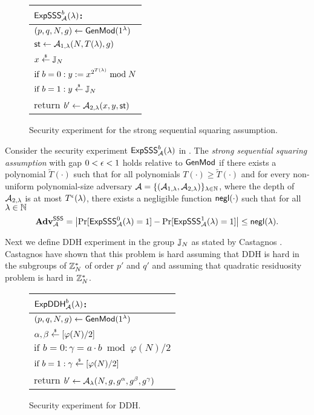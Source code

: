 \begin{figure}[h]
\begin{center}
\begin{tabular}{l}
$\mathsf{ExpSSS}_{\mathcal{A}}^{b}(\lambda)$: \\
\hline
$(p, q, N,g) \leftarrow \mathsf{GenMod}(1{^{\lambda}})$ \\
$\mathsf{st} \leftarrow \mathcal{A}_{1, \lambda}(N, T(\lambda),g)$\\
$x \stackrel{{\scriptscriptstyle\$}}{\leftarrow} \mathbb{J}_N$ \\
$\text{if } b = 0: y:=x^{2^{T(\lambda)}} \bmod N$\\
$\text{if } b = 1: y \stackrel{{\scriptscriptstyle\$}}{\leftarrow} \mathbb{J}_N$\\
return	$b' \leftarrow \mathcal{A}_{2,\lambda}(x, y, \mathsf{st})$
\end{tabular}
\end{center}
\caption{\label{fig:sss}Security experiment for the strong sequential squaring assumption.}
\end{figure}


\begin{definition}\label{def:sssa}
Consider the security experiment $\mathsf{ExpSSS}_{\mathcal{A}}^{b}(\lambda)$ in . The \emph{strong sequential squaring assumption} with gap $0< \epsilon <1$ holds relative to $\mathsf{GenMod}$ if there exists a polynomial $\tilde{T}(\cdot)$ such that for all polynomials $T(\cdot) \geq \tilde{T}(\cdot)$ and for every non-uniform polynomial-size adversary $\mathcal{A} = \{(\mathcal{A}_{1,\lambda}, \mathcal{A}_{2,\lambda})\}_{\lambda \in \mathbb{N}}$, where the depth of $\mathcal{A}_{2,\lambda}$ is at most $T^{\epsilon}(\lambda)$, there exists a negligible function $\mathsf{negl}(\cdot)$ such that for all $\lambda \in \mathbb{N}$ 
\[\mathbf{Adv}^\mathsf{SSS}_{\mathcal{A}} = \left| \Pr[\mathsf{ExpSSS}_{\mathcal{A}}^{0}(\lambda) = 1] - \Pr[\mathsf{ExpSSS}_{\mathcal{A}}^{1}(\lambda) = 1] \right| \leq \mathsf{negl}(\lambda).\]
\end{definition}

Next we define DDH experiment in the group $\mathbb{J}_N$ as stated by Castagnos \etal \cite{C:CouPetPoi16}. Castagnos \etal have shown that this problem is hard assuming that DDH is hard in the subgroups of $\mathbb{Z}_N^*$ of order $p'$ and $q'$ and assuming that quadratic residuosity problem is hard in $\mathbb{Z}_N^*$.  

\begin{figure}[h]
\begin{center}
\begin{tabular}{l}
$\mathsf{ExpDDH}_{\mathcal{A}}^{b}(\lambda)$: \\
\hline
$(p, q, N,g) \leftarrow \mathsf{GenMod}(1{^{\lambda}})$ \\
$\alpha, \beta \stackrel{{\scriptscriptstyle\$}}{\leftarrow} [\varphi(N)/2]$ \\
$\text{if } b = 0: \gamma = a\cdot b \bmod \varphi(N)/2$\\
$\text{if } b = 1: \gamma \stackrel{{\scriptscriptstyle\$}}{\leftarrow} [\varphi(N)/2]$ \\
return	$b' \leftarrow \mathcal{A}_{\lambda}(N,g,g^\alpha, g^\beta, g^\gamma)$
\end{tabular}
\end{center}
\caption{\label{fig:ddh}Security experiment for DDH.}
\end{figure}
 

